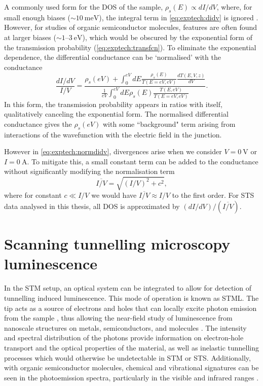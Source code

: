A commonly used form for the \ac{DOS} of the sample, $\rho_s(E) \propto dI/dV $, where, for small enough biases ($\sim \SI{10}{\milli\electronvolt}$), the integral term in \autoref{eq:exptech:didv} is ignored \citep{feenstra1993methods}. However, for studies of organic semiconductor molecules, features are often found at larger biases ($\sim 1$--$\SI{3}{\electronvolt}$), which would be obscured by the exponential form of the transmission probability (\autoref{eq:exptech:transfcn}). To eliminate the exponential dependence, the differential conductance can be `normalised' with the conductance  \citep{feenstra1987atom}
\begin{equation} \label{eq:exptech:normdidv}
\frac{dI/dV}{I/V} = \frac{\rho_s(eV) + \int_0 ^{eV} dE \frac{\rho_s(E)}{T(E=eV,eV)} \frac{dT(E,V,z)}{dV}}{ \frac{1}{eV} \int_0^{eV} dE \rho_s(E) \frac{T(E,eV)}{T(E=eV,eV)}}.
\end{equation}
In this form, the transmission probability appears in ratios with itself, qualitatively canceling the exponential form. The normalised differential conductance gives the $\rho_s(eV)$ with some ``background" term arising from interactions of the wavefunction with the electric field in the junction.

However in \autoref{eq:exptech:normdidv}, divergences arise when we consider $V=\SI{0}{\volt}$ or $I= \SI{0}{\ampere}$. To mitigate this, a small constant term can be added to the conductance without significantly modifying the normalisation term \citep{prietsch1991structural}
\begin{equation}
    \overline{I/V} = \sqrt{(I/V)^2 + c^2},
\end{equation}
where for constant $c\ll I/V$ we would have $\overline{I/V} \approx I/V$ to the first order. For \ac{STS} data analysed in this thesis, all \ac{DOS} is approximated by $ (dI/dV) / (\overline{I/V})$.

\section{Scanning tunnelling microscopy luminescence}

In the \ac{STM} setup, an optical system can be integrated to allow for detection of tunnelling induced luminescence. This mode of operation is known as \acf{STML}. The tip acts as a source of electrons and holes that can locally excite photon emission from the sample \citep{gimzewski1988photon}, thus allowing the near-field study of luminescence from nanoscale structures on metals, semiconductors, and molecules \citep{Qiu2003}. The intensity and spectral distribution of the photons provide information on electron-hole transport and the optical properties of the material, as well as inelastic tunnelling processes which would otherwise be undetectable in \ac{STM} or \ac{STS}. Additionally, with organic semiconductor molecules, chemical and vibrational signatures can be seen in the photoemission spectra, particularly in the visible and infrared ranges \citep{Qiu2003,Wu2008}.

